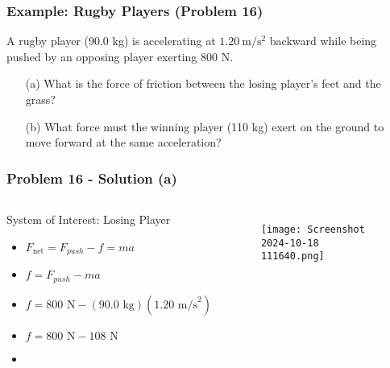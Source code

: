 \documentclass{beamer}
\begin{document}
\begin{frame}
\frametitle{Example: Rugby Players (Problem 16)}
A rugby player (90.0 kg) is accelerating at $1.20 \mathrm{~m} / \mathrm{s}^{2}$ backward while being pushed by an opposing player exerting 800 N.
\begin{itemize}
    \item[(a)] What is the force of friction between the losing player's feet and the grass?
    \item[(b)] What force must the winning player (110 kg) exert on the ground to move forward at the same acceleration?
\end{itemize}
\end{frame}

\begin{frame}
\frametitle{Problem 16 - Solution (a)}
\begin{columns}[T]
        \begin{block}{System of Interest: Losing Player}
            \begin{itemize}
                \item $F_{\text{net}} = F_{push} - f = ma$
                \item $f = F_{push} - ma$
                \item $f = 800 \text{ N} - (90.0 \text{ kg})(1.20 \text{ m/s}^2)$
                \item $f = 800 \text{ N} - 108 \text{ N}$
                \item {}
            \end{itemize}
        \end{block}
        \begin{figure}
            \centering
            \texttt{[image: Screenshot 2024-10-18 111640.png]}
        \end{figure}
\end{columns}
\end{frame}
\end{document}
